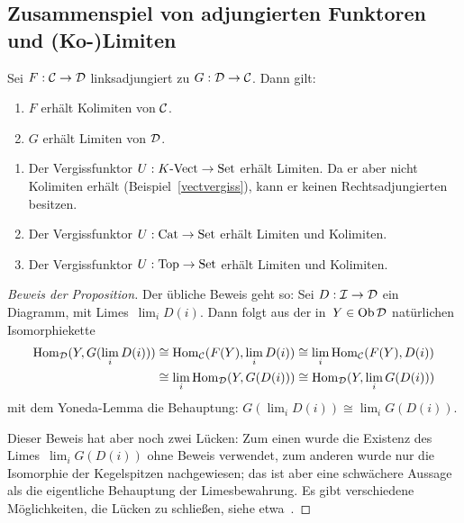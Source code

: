 

\subsection{Zusammenspiel von adjungierten Funktoren und (Ko-)Limiten}

\begin{prop}
Sei $F:\mathcal{C}\to\mathcal{D}$ linksadjungiert zu $G:\mathcal{D}\to\mathcal{C}$. Dann gilt:
\begin{enumerate}
\item $F$ erhält Kolimiten von $\mathcal{C}$.
\item $G$ erhält Limiten von $\mathcal{D}$.
\end{enumerate}
\end{prop}

\begin{bsp}\label{vergissstetig}
\begin{enumerate}
\item Der Vergissfunktor $U:{K\text{-}\mathrm{Vect}} \to \mathrm{Set}$ erhält Limiten.
Da er aber nicht Kolimiten erhält (Beispiel~\ref{vectvergiss}), kann er keinen
Rechtsadjungierten besitzen.
\item \label{vergisscat}Der Vergissfunktor $U:\mathrm{Cat} \to \mathrm{Set}$ erhält Limiten und Kolimiten.
\item Der Vergissfunktor $U:\mathrm{Top} \to \mathrm{Set}$ erhält Limiten und Kolimiten.
\end{enumerate}
\end{bsp}

\begin{proof}[Beweis der Proposition]
Der übliche Beweis geht so: Sei $D:\mathcal{I}\to\mathcal{D}$ ein Diagramm, mit Limes~$\lim_i D(i)$.
Dann folgt aus der in~$Y \in \operatorname{Ob}\mathcal{D}$ natürlichen Isomorphiekette
\begin{align*}
  \mathrm{Hom}_{\mathcal{D}}(Y,G(\lim_i D(i))) &\cong
  \mathrm{Hom}_{\mathcal{C}}(F(Y),\lim_i D(i)) \cong
  \lim_i \mathrm{Hom}_{\mathcal{C}}(F(Y), D(i)) \\
  & \cong
  \lim_i \mathrm{Hom}_{\mathcal{D}}(Y, G(D(i))) \cong
  \mathrm{Hom}_{\mathcal{D}}(Y, \lim_i G(D(i)))
\end{align*}
mit dem Yoneda-Lemma die Behauptung: $G(\lim_i D(i)) \cong \lim_i G(D(i))$.

Dieser Beweis hat aber noch zwei Lücken: Zum einen wurde die Existenz des
Limes~$\lim_i G(D(i))$ ohne Beweis verwendet, zum anderen wurde nur die
Isomorphie der Kegelspitzen nachgewiesen; das ist aber eine schwächere Aussage
als die eigentliche Behauptung der Limesbewahrung. Es gibt verschiedene
Möglichkeiten, die Lücken zu schließen, siehe etwa~\cite{gaillard,lin}.
\end{proof}


